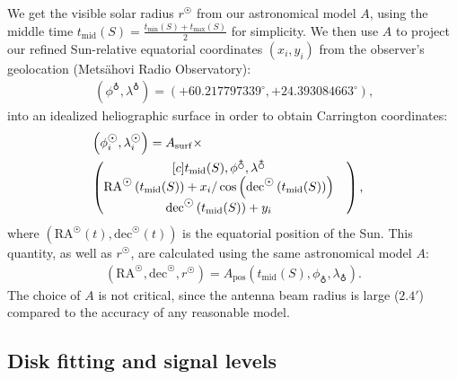 \documentclass{aa}
\newcommand{\arrc}[1]{\begin{matrix}[c] #1 \end{matrix}}
\newcommand{\eqnl}[2]{\begin{eqnarray}\label{#1}#2\end{eqnarray}}
\newcommand{\s}[2]{{#1}_{\mathrm{#2}}}
\begin{document}
We get the visible solar radius $r^{\astrosun}$ from our astronomical model $A$, using the middle time $\s{t}{mid}(S) = 
\frac{\s{t}{min}(S) + \s{t}{max}(S)}{2}$ for simplicity. We then use $A$ to project our refined Sun-relative equatorial coordinates $(x_i,y_i)$ 
from the observer's geolocation (Metsähovi Radio Observatory):
\eqnl{mro_geolocation}{
(\phi^{\earth}, \lambda^{\earth}) = \left( +60.217797339^{\circ}, +24.393084663^{\circ} 
\right) \text{,}}
into an idealized heliographic surface 
in order to obtain Carrington coordinates:
\eqnl{carrington_coordinates}{
&\left( \phi^{\astrosun}_i, 
\lambda^{\astrosun}_i \right) = A_{\rm surf} \times& \\
&\left( \arrc{\s{t}{mid}(S), \phi^{\earth}, \lambda^{\earth}
\\
\mathrm{RA}^{\astrosun} \left( \s{t}{mid}(S) \right) + x_i / \cos \left( \mathrm{dec}^{\astrosun} \left( \s{t}{mid}(S) \right) \right)&
\\
\mathrm{dec}^{\astrosun} \left( \s{t}{mid}(S) \right) + y_i} \right) \nonumber 
\text{,}
}
where $\left( \mathrm{RA}^{\astrosun}(t), \mathrm{dec}^{\astrosun}(t) \right)$ is the equatorial position of the Sun. This quantity, as well as $r^{\astrosun}$, are calculated using the same astronomical model $A$:
\eqnl{astromodel}{
\left( \mathrm{RA}^{\astrosun}, \mathrm{dec}^{\astrosun}, r^{\astrosun} \right) = \s{A}{pos} \left( \s{t}{mid}(S), \phi_{\earth}, \lambda_{\earth} \right) \text{.}
}
The choice of $A$ is not critical, since the antenna beam radius is large ($2.4 \prime$) compared to the accuracy of any 
reasonable model.

\subsection{Disk fitting and signal levels} \label{Sect:DiskFitting}
\end{document}
